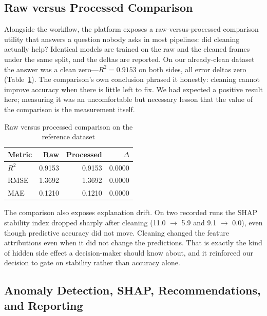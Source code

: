 \documentclass[conference]{IEEEtran}
\begin{document}
\subsection{Raw versus Processed Comparison}\label{sec:rawproc}

Alongside the workflow, the platform exposes a raw-versus-processed comparison utility that answers a question nobody asks in most pipelines: did cleaning actually help? Identical models are trained on the raw and the cleaned frames under the same split, and the deltas are reported. On our already-clean dataset the answer was a clean zero---$R^2 = 0.9153$ on both sides, all error deltas zero (Table~\ref{tab:rawproc}). The comparison's own conclusion phrased it honestly: cleaning cannot improve accuracy when there is little left to fix. We had expected a positive result here; measuring it was an uncomfortable but necessary lesson that the value of the comparison is the measurement itself.

\begin{table}[!t]
\caption{Raw versus processed comparison on the reference dataset}
\label{tab:rawproc}
\centering
\begin{tabular}{@{}lrrr@{}}
\toprule
Metric & Raw & Processed & $\Delta$ \\
\midrule
$R^2$ & 0.9153 & 0.9153 & 0.0000 \\
RMSE & 1.3692 & 1.3692 & 0.0000 \\
MAE & 0.1210 & 0.1210 & 0.0000 \\
\bottomrule
\end{tabular}
\end{table}

The comparison also exposes explanation drift. On two recorded runs the SHAP stability index dropped sharply after cleaning (11.0 $\rightarrow$ 5.9 and 9.1 $\rightarrow$ 0.0), even though predictive accuracy did not move. Cleaning changed the feature attributions even when it did not change the predictions. That is exactly the kind of hidden side effect a decision-maker should know about, and it reinforced our decision to gate on stability rather than accuracy alone.

\subsection{Anomaly Detection, SHAP, Recommendations, and Reporting}
\end{document}
